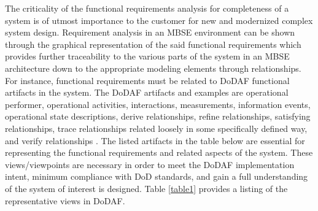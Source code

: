 \documentclass[num-refs]{wiley-article}
\begin{document}
The criticality of the functional requirements analysis for completeness of a system is of utmost importance to the customer for new and modernized complex system design. Requirement analysis in an MBSE environment can be shown through the graphical representation of the said functional requirements which provides further traceability to the various parts of the system in an MBSE architecture down to the appropriate modeling elements through  relationships. For instance, functional requirements must be related to DoDAF functional artifacts in the system. The DoDAF artifacts and examples are operational performer, operational activities, interactions, measurements, information events, operational state descriptions, derive relationships, refine relationships, satisfying relationships, trace relationships related loosely in some specifically defined way, and verify relationships \cite{Stroud2016}. The listed artifacts in the table below are essential for representing the functional requirements and related aspects of the system. These views/viewpoints are necessary in order to meet the DoDAF implementation intent, minimum compliance with DoD standards, and gain a full understanding of the system of interest is designed. Table \ref{table1} provides a listing of the representative views in DoDAF.
\end{document}
